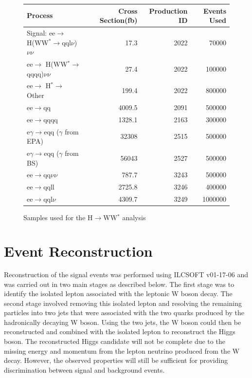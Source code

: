 \begin{figure}
  \centering
  \begin{tabular}{l r r r}
   \toprule
    Process     & Cross Section(fb)  &   Production ID\cite{bib-prodids}    & Events Used    \\
    \midrule
    Signal: ee$\rightarrow$ H(WW$^*\rightarrow$qql$\nu$)$\nu\nu$             &   17.3  &  2022  & 70000  \\ 
    \midrule
    ee$\rightarrow$ H(WW$^*\rightarrow$qqqq)$\nu\nu$                &   27.4  &  2022    & 100000 \\
    \midrule
    ee$\rightarrow$ H$^*\rightarrow$ Other & 199.4 & 2022 & 800000  \\
    \midrule
    ee$\rightarrow$qq               & 4009.5    &  2091  & 500000  \\ 
    \midrule
    ee$\rightarrow$qqqq               & 1328.1    &  2163  & 300000  \\ 
    \midrule
    e$\gamma$$\rightarrow$eqq ($\gamma$ from EPA)                 & 32308    &  2515 & 500000   \\ 
    \midrule
    e$\gamma$$\rightarrow$eqq ($\gamma$ from BS)               & 56043  &  2527  & 500000 \\ 
    \midrule
    ee$\rightarrow$qq$\nu\nu$               & 787.7    &  3243 & 500000   \\ 
    \midrule
    ee$\rightarrow$qqll               & 2725.8    &  3246  & 400000  \\ 
    \midrule
    ee$\rightarrow$qql$\nu$              & 4309.7    &  3249 & 1000000   \\ 
    \bottomrule
  \end{tabular}
  \caption[Samples used for the H$\rightarrow$WW$^*$ analysis]{Samples used for the H$\rightarrow$WW$^*$ analysis}
  \label{fig:higgsbackgrounds}
\end{figure}


\section{Event Reconstruction}

Reconstruction of the signal events was performed using ILCSOFT v01-17-06 and was carried out in two main stages as described below. The first stage was to identify the isolated lepton associated with the leptonic W boson decay. The second stage involved removing this isolated lepton and resolving the remaining particles into two jets that were associated with the two quarks produced by the hadronically decaying W boson. Using the two jets, the W boson could then be reconstructed and combined with the isolated lepton to reconstruct the Higgs boson. The reconstructed Higgs candidate will not be complete due to the missing energy and momentum  from the lepton neutrino produced from the W decay. However, the observed properties will still be sufficient for providing discrimination between signal and background events.

